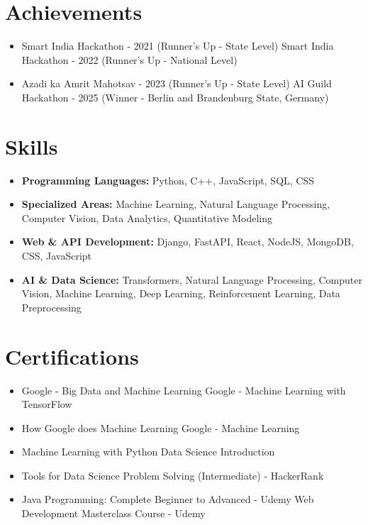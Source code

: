 \documentclass[a4paper,10pt]{article}
\begin{document}
\section*{Achievements}
\begin{itemize}
\item Smart India Hackathon - 2021 (Runner's Up - State Level) \hfill Smart India Hackathon - 2022 (Runner's Up - National Level)
\item Azadi ka Amrit Mahotsav - 2023 (Runner's Up - State Level) \hfill AI Guild Hackathon - 2025 (Winner - Berlin and Brandenburg State, Germany)
\end{itemize}

\section*{Skills}
\begin{itemize}
  \item \textbf{Programming Languages:} Python, C++, JavaScript, SQL, CSS
  \item \textbf{Specialized Areas:} Machine Learning, Natural Language Processing, Computer Vision, Data Analytics, Quantitative Modeling
  \item \textbf{Web \& API Development:} Django, FastAPI, React, NodeJS, MongoDB, CSS, JavaScript
  \item \textbf{AI \& Data Science:} Transformers, Natural Language Processing, Computer Vision, Machine Learning, Deep Learning, Reinforcement Learning, Data Preprocessing
\end{itemize}

\section*{Certifications}
\begin{itemize}
\item Google - Big Data and Machine Learning \hfill Google - Machine Learning with TensorFlow
\item How Google does Machine Learning \hfill Google - Machine Learning
\item Machine Learning with Python \hfill Data Science Introduction
\item Tools for Data Science \hfill Problem Solving (Intermediate) - HackerRank
\item Java Programming: Complete Beginner to Advanced - Udemy \hfill Web Development Masterclass Course - Udemy
\end{itemize}
\end{document}
